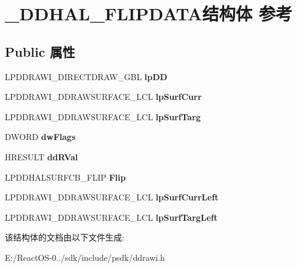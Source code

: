 \hypertarget{struct___d_d_h_a_l___f_l_i_p_d_a_t_a}{}\section{\+\_\+\+D\+D\+H\+A\+L\+\_\+\+F\+L\+I\+P\+D\+A\+T\+A结构体 参考}
\label{struct___d_d_h_a_l___f_l_i_p_d_a_t_a}
\subsection*{Public 属性}
\begin{DoxyCompactItemize}
\item 
\mbox{\label{struct___d_d_h_a_l___f_l_i_p_d_a_t_a_a10d0795f3aeeb7ed546be9658c35a635}} 
L\+P\+D\+D\+R\+A\+W\+I\+\_\+\+D\+I\+R\+E\+C\+T\+D\+R\+A\+W\+\_\+\+G\+BL {\bfseries lp\+DD}
\item 
\mbox{\label{struct___d_d_h_a_l___f_l_i_p_d_a_t_a_a5479f35965eb9d493b97b7039c38f862}} 
L\+P\+D\+D\+R\+A\+W\+I\+\_\+\+D\+D\+R\+A\+W\+S\+U\+R\+F\+A\+C\+E\+\_\+\+L\+CL {\bfseries lp\+Surf\+Curr}
\item 
\mbox{\label{struct___d_d_h_a_l___f_l_i_p_d_a_t_a_a99607a72d7d07d2021efffb7af3e3681}} 
L\+P\+D\+D\+R\+A\+W\+I\+\_\+\+D\+D\+R\+A\+W\+S\+U\+R\+F\+A\+C\+E\+\_\+\+L\+CL {\bfseries lp\+Surf\+Targ}
\item 
\mbox{\label{struct___d_d_h_a_l___f_l_i_p_d_a_t_a_ad7d84d4cd10decdacff62c3474a6db73}} 
D\+W\+O\+RD {\bfseries dw\+Flags}
\item 
\mbox{\label{struct___d_d_h_a_l___f_l_i_p_d_a_t_a_a65a2cd3987b957a1a7557e1c691a3be6}} 
H\+R\+E\+S\+U\+LT {\bfseries dd\+R\+Val}
\item 
\mbox{\label{struct___d_d_h_a_l___f_l_i_p_d_a_t_a_ac41f0d1895c5cd666e13563e924062e1}} 
L\+P\+D\+D\+H\+A\+L\+S\+U\+R\+F\+C\+B\+\_\+\+F\+L\+IP {\bfseries Flip}
\item 
\mbox{\label{struct___d_d_h_a_l___f_l_i_p_d_a_t_a_aad21243539a889302cb7ede1cc989706}} 
L\+P\+D\+D\+R\+A\+W\+I\+\_\+\+D\+D\+R\+A\+W\+S\+U\+R\+F\+A\+C\+E\+\_\+\+L\+CL {\bfseries lp\+Surf\+Curr\+Left}
\item 
\mbox{\label{struct___d_d_h_a_l___f_l_i_p_d_a_t_a_a0464a7952bfb29df3f0dae24e202b719}} 
L\+P\+D\+D\+R\+A\+W\+I\+\_\+\+D\+D\+R\+A\+W\+S\+U\+R\+F\+A\+C\+E\+\_\+\+L\+CL {\bfseries lp\+Surf\+Targ\+Left}
\end{DoxyCompactItemize}


该结构体的文档由以下文件生成\+:\begin{DoxyCompactItemize}
\item 
E\+:/\+React\+O\+S-\/0../sdk/include/psdk/ddrawi.\+h\end{DoxyCompactItemize}
